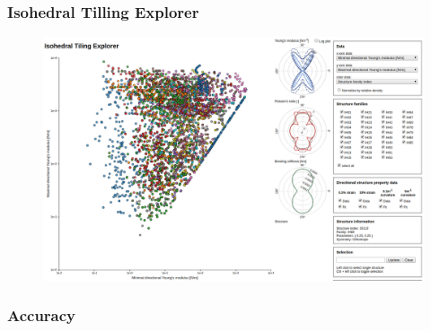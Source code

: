 \documentclass[serif,mathserif, 12pt]{beamer}
\begin{document}
\begin{frame}
  \frametitle{Isohedral Tilling Explorer}
  \begin{figure}
    \centering
    \includegraphics[width=\textwidth]{img/gallery}
  \end{figure}
\end{frame}

\begin{frame}
  \frametitle{Accuracy}
\end{frame}
\end{document}
